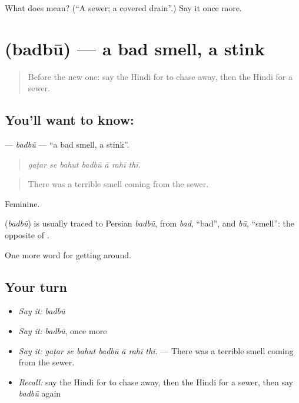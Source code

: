 \begin{tcolorbox}[breakable,colback=teal!4,colframe=teal!35!black,title={Before you move on}]
What does  mean? (\textquotedblleft{}A sewer; a covered drain\textquotedblright{}.) Say it once more.
\end{tcolorbox}
\section[\texorpdfstring{\hi{बदबू} (badbū)}{बदबू (badbū)}]{ (badbū) — a bad smell, a stink}

\label{lesson:HI-C425-badbu}



\begin{quote}
Before the new one: say the Hindi for to chase away, then the Hindi for a sewer.
\end{quote}

\subsection*{You'll want to know: }
\textbf{} — \emph{badbū} — \textquotedblleft{}a bad smell, a stink\textquotedblright{}.

\begin{quote}
      
\end{quote}

\begin{quote}
\emph{gaṭar se bahut badbū ā rahī thī.}
\end{quote}

\begin{quote}
There was a terrible smell coming from the sewer.
\end{quote}

Feminine.

\begin{cousinweb}
\textbf{} (\emph{badbū}) is usually traced to Persian \emph{badbū}, from \emph{bad}, \textquotedblleft{}bad\textquotedblright{}, and \emph{bū}, \textquotedblleft{}smell\textquotedblright{}: the opposite of .
\end{cousinweb}

\begin{grammarlens}[title={What you've built}]
One more word for getting around.
\end{grammarlens}

\subsection*{Your turn}
\begin{itemize}
\raggedright
  \item \emph{Say it:} \emph{badbū}
  \item \emph{Say it:} \emph{badbū}, once more
  \item \emph{Say it:} \emph{gaṭar se bahut badbū ā rahī thī.} — There was a terrible smell coming from the sewer.
  \item \emph{Recall:} say the Hindi for to chase away, then the Hindi for a sewer, then say \emph{badbū} again
\end{itemize}

